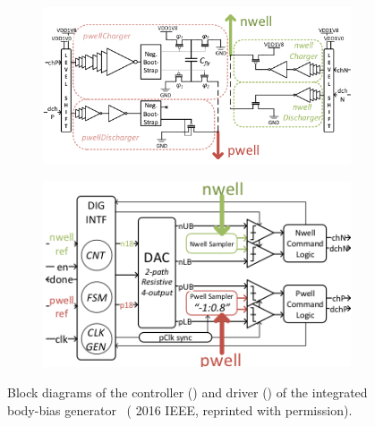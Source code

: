 \documentclass[graybox]{svmult}
\begin{document}
\begin{figure}
  \centering
  \begin{subfigure}[t]{0.6\textwidth}
  \centering
  \includegraphics[width=\textwidth]{bbgen-blockdiagram-a}
  \caption{}
  \label{fig:bbgen-blockdiagram-a}
  \end{subfigure}
  \par\bigskip
  \begin{subfigure}[t]{0.6\textwidth}
  \centering
  \includegraphics[width=\textwidth]{bbgen-blockdiagram-b}
  \caption{}
  \label{fig:bbgen-blockdiagram-b}
  \end{subfigure}
  \caption{Block diagrams of the controller () and driver () of the integrated body-bias generator~\cite{Blagojevic2016} ({\textcopyright} 2016 IEEE, reprinted with permission).}
  \label{fig:bbgen-blockdiagram}
\end{figure}
\end{document}
